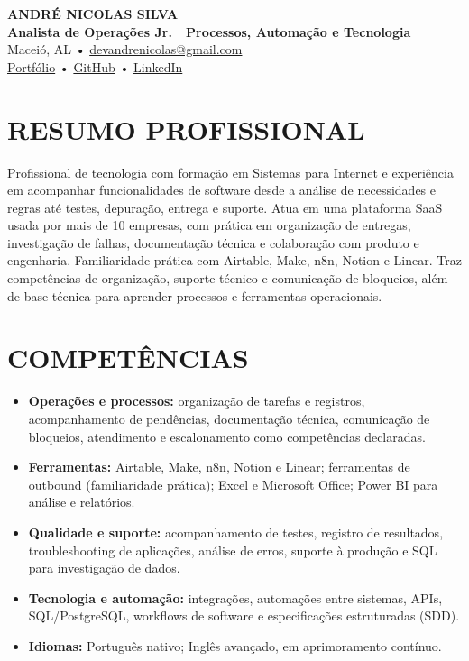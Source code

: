 \documentclass[10pt,a4paper]{article}
\begin{document}
\begin{center}
    {\LARGE \textbf{ANDRÉ NICOLAS SILVA}}\\[-2pt]
    {\normalsize \textbf{Analista de Operações Jr. | Processos, Automação e Tecnologia}}\\[2pt]
    \footnotesize Maceió, AL \quad • \quad
    \href{mailto:devandrenicolas@gmail.com}{devandrenicolas@gmail.com}\\
    \href{https://portfolio-andrenicolas.vercel.app}{Portfólio}
    \quad • \quad \href{https://github.com/devAndreNicolas}{GitHub}
    \quad • \quad \href{https://www.linkedin.com/in/devandrenicolas}{LinkedIn}
\end{center}

\section*{RESUMO PROFISSIONAL}
Profissional de tecnologia com formação em Sistemas para Internet e experiência em acompanhar funcionalidades de software desde a análise de necessidades e regras até testes, depuração, entrega e suporte. Atua em uma plataforma SaaS usada por mais de 10 empresas, com prática em organização de entregas, investigação de falhas, documentação técnica e colaboração com produto e engenharia. Familiaridade prática com Airtable, Make, n8n, Notion e Linear. Traz competências de organização, suporte técnico e comunicação de bloqueios, além de base técnica para aprender processos e ferramentas operacionais.

\section*{COMPETÊNCIAS}
\begin{itemize}
    \item \textbf{Operações e processos:} organização de tarefas e registros, acompanhamento de pendências, documentação técnica, comunicação de bloqueios, atendimento e escalonamento como competências declaradas.
    \item \textbf{Ferramentas:} Airtable, Make, n8n, Notion e Linear; ferramentas de outbound (familiaridade prática); Excel e Microsoft Office; Power BI para análise e relatórios.
    \item \textbf{Qualidade e suporte:} acompanhamento de testes, registro de resultados, troubleshooting de aplicações, análise de erros, suporte à produção e SQL para investigação de dados.
    \item \textbf{Tecnologia e automação:} integrações, automações entre sistemas, APIs, SQL/PostgreSQL, workflows de software e especificações estruturadas (SDD).
    \item \textbf{Idiomas:} Português nativo; Inglês avançado, em aprimoramento contínuo.
\end{itemize}
\end{document}
